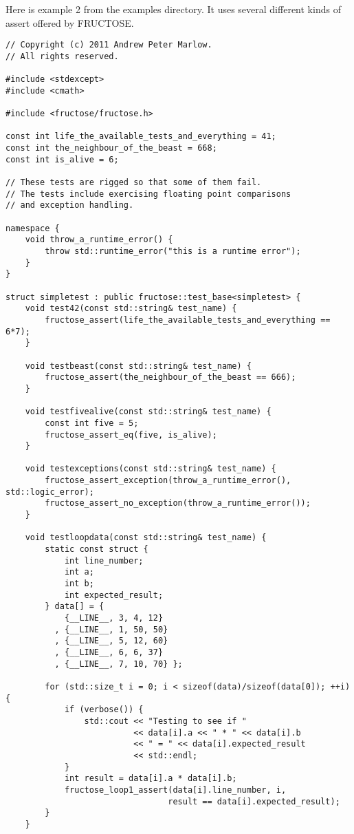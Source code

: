 \documentclass{book}
\begin{document}

Here is example 2 from the examples directory.
It uses several different kinds of assert offered by FRUCTOSE.

\begin{verbatim}
// Copyright (c) 2011 Andrew Peter Marlow.
// All rights reserved.

#include <stdexcept>
#include <cmath>

#include <fructose/fructose.h>

const int life_the_available_tests_and_everything = 41;
const int the_neighbour_of_the_beast = 668;
const int is_alive = 6;

// These tests are rigged so that some of them fail.
// The tests include exercising floating point comparisons
// and exception handling.

namespace {
    void throw_a_runtime_error() {
        throw std::runtime_error("this is a runtime error");
    }
}

struct simpletest : public fructose::test_base<simpletest> {
    void test42(const std::string& test_name) {
        fructose_assert(life_the_available_tests_and_everything == 6*7);
    }

    void testbeast(const std::string& test_name) {
        fructose_assert(the_neighbour_of_the_beast == 666);
    }

    void testfivealive(const std::string& test_name) {
        const int five = 5;
        fructose_assert_eq(five, is_alive);
    }

    void testexceptions(const std::string& test_name) {
        fructose_assert_exception(throw_a_runtime_error(), std::logic_error);
        fructose_assert_no_exception(throw_a_runtime_error());
    }

    void testloopdata(const std::string& test_name) {
        static const struct {
            int line_number;
            int a;
            int b;
            int expected_result;
        } data[] = {
            {__LINE__, 3, 4, 12}
          , {__LINE__, 1, 50, 50}
          , {__LINE__, 5, 12, 60}
          , {__LINE__, 6, 6, 37}
          , {__LINE__, 7, 10, 70} };

        for (std::size_t i = 0; i < sizeof(data)/sizeof(data[0]); ++i) {
            if (verbose()) {
                std::cout << "Testing to see if "
                          << data[i].a << " * " << data[i].b 
                          << " = " << data[i].expected_result
                          << std::endl;
            }
            int result = data[i].a * data[i].b;
            fructose_loop1_assert(data[i].line_number, i,
                                 result == data[i].expected_result);
        }
    }


\end{verbatim}
\end{document}
